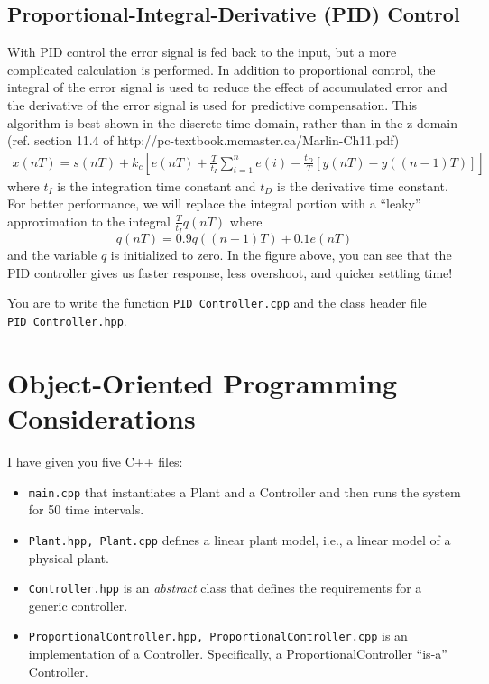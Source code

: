 \documentclass[12pt]{article}
\begin{document}
\subsection{Proportional-Integral-Derivative (PID) Control}
With PID control the error signal is fed back to the input, but a more complicated calculation is performed.
In addition to proportional control, the integral of the error signal is used to reduce the effect of accumulated error and the derivative
of the error signal is used for predictive compensation.
This algorithm is best shown in the discrete-time domain, rather than in the z-domain (ref. section 11.4 of http://pc-textbook.mcmaster.ca/Marlin-Ch11.pdf)
\begin{align}
x(nT) = s(nT) + k_c \left[e(nT) + \frac{T}{t_I}\sum_{i=1}^n e(i) - \frac{t_D}{T} \left[ y(nT) - y((n-1)T) \right] \right]
\end{align}
where $t_I$ is the integration time constant and $t_D$ is the derivative time constant.  For better performance, we will replace the integral portion with a ``leaky'' approximation to the integral $\frac{T}{t_I} q(nT)$ where 
\[
q(nT) = 0.9q((n-1)T) + 0.1e(nT)
\]
and the variable $q$ is initialized to zero.
In the figure above, you can see that the PID controller gives us faster response, less overshoot, and quicker settling time!

You are to write the function  \texttt{PID\_Controller.cpp} and the class header file \texttt{PID\_Controller.hpp}.

\section{Object-Oriented Programming Considerations}
I have given you five C++ files: 
\begin{itemize}
\item \texttt{main.cpp} that instantiates a Plant and a Controller and then runs the system for 50 time intervals.
\item \texttt{Plant.hpp, Plant.cpp} defines a linear plant model, i.e., a linear model of a physical plant.
\item \texttt{Controller.hpp} is an \emph{abstract} class that defines the requirements for a generic controller.
\item \texttt{ProportionalController.hpp, ProportionalController.cpp} is an implementation of a Controller.  Specifically, a ProportionalController ``is-a'' Controller.
\end{itemize}
\end{document}
